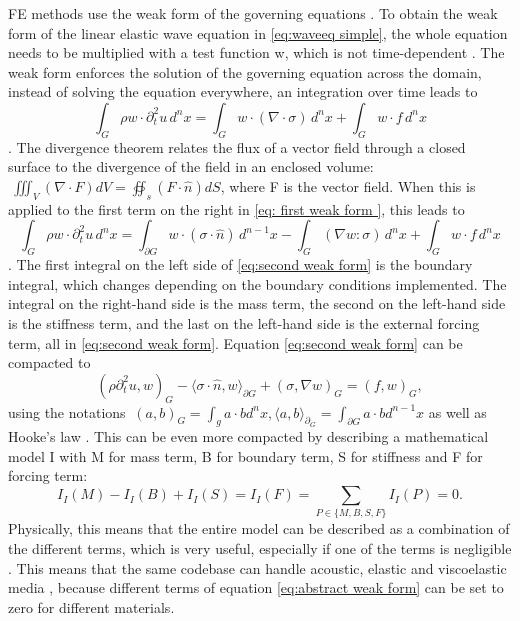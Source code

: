 FE methods use the weak form of the governing equations \parencite{FiniteElementMethod}. To obtain the weak form of the linear elastic wave equation in \ref{eq:waveeq simple}, the whole equation needs to be multiplied with a test function w, which is not time-dependent \parencite{afanasievModularFlexibleSpectralelement2019}. The weak form enforces the solution of the governing equation across the domain, instead of solving the equation everywhere, an integration over time leads to \begin{equation}
  \int_{G} \rho w \cdot \partial_t^2u\, d^n x = \int_G w \cdot (\nabla \cdot \sigma)\, d^n x + \int_G w \cdot f\, d^n x
  \label{eq: first weak form }
\end{equation} \parencite{afanasievModularFlexibleSpectralelement2019}. The divergence theorem relates the flux of a vector field through a closed surface to the divergence of the field in an enclosed volume: $\ \iiint_V (\nabla \cdot F) dV = \oiint_s (F \cdot \hat{n}) dS $, where F is the vector field. When this is applied to the first term on the right in \ref{eq: first weak form }, this leads to \begin{equation}
  \int_{G} \rho w \cdot \partial_t^2 u\, d^n x = \int_{\partial G} w \cdot (\sigma \cdot \hat{n})\, d^{n-1}x - \int_G (\nabla w : \sigma)\, d^n x + \int_G w \cdot f\, d^n x
  \label{eq:second weak form}
\end{equation} \parencite{afanasievModularFlexibleSpectralelement2019}. The first integral on the left side of \ref{eq:second weak form} is the boundary integral, which changes depending on the boundary conditions implemented. The integral on the right-hand side is the mass term, the second on the left-hand side is the stiffness term, and the last on the left-hand side is the external forcing term, all in \ref{eq:second weak form}. Equation \ref{eq:second weak form} can be compacted to \begin{equation}
  (\rho\partial_t^2u,w)_G - \langle \sigma \cdot \hat{n}, w \rangle_{\partial G} + (\sigma, \nabla w)_G = (f,w)_G,
  \label{eq:compact weak form}
\end{equation} using the notations $\ (a,b)_G = \int_g a \cdot b d^nx, \langle a,b\rangle_{\partial_G} = \int_{\partial G}  a \cdot b d^{n-1}x$  as well as Hooke's law \parencite{afanasievModularFlexibleSpectralelement2019}. This can be even more compacted by describing a mathematical model I with M for mass term, B for boundary term, S for stiffness and F for forcing term: \begin{equation}
I_I(M) - I_I(B) + I_I(S) = I_I(F) = \sum_{P \in \{M,B,S,F\}} I_I(P) = 0.
\label{eq:abstract weak form}
\end{equation} Physically, this means that the entire model can be described as a combination of the different terms, which is very useful, especially if one of the terms is negligible \parencite{afanasievModularFlexibleSpectralelement2019}. This means that the same codebase can handle acoustic, elastic and viscoelastic media \parencite{afanasievModularFlexibleSpectralelement2019}, because different terms of equation \ref{eq:abstract weak form} can be set to zero for different materials. \par 

